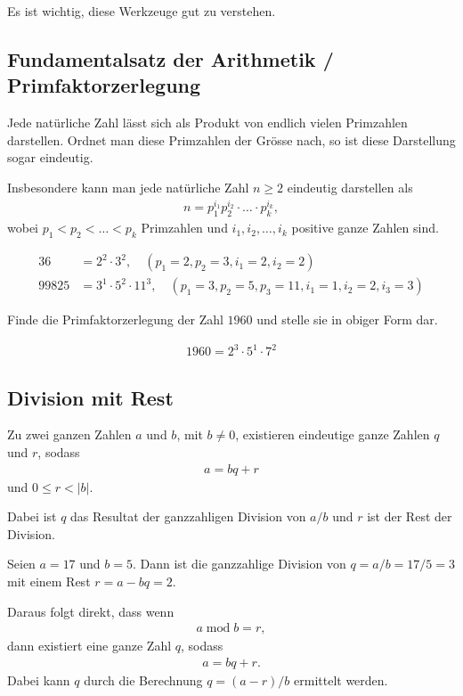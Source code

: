 Es ist wichtig, diese Werkzeuge gut zu verstehen.

\subsection{Fundamentalsatz der Arithmetik / Primfaktorzerlegung}
Jede natürliche Zahl lässt sich als Produkt von endlich vielen Primzahlen darstellen. Ordnet man diese Primzahlen der Grösse nach, so ist diese Darstellung sogar eindeutig.

Insbesondere kann man jede natürliche Zahl $n\geq 2$ eindeutig darstellen als
\begin{align}
	n = p_{1}^{i_1}p_{2}^{i_2}\cdot \ldots \cdot p_{k}^{i_k},
\end{align}
wobei $p_1<p_2<\ldots <p_k$ Primzahlen und $i_1, i_2, \ldots , i_k$ positive ganze Zahlen sind.

\begin{myexample}
\begin{align*}
	36    & = 2^2\cdot 3^2, \quad (p_1 = 2, p_2 = 3, i_1 = 2, i_2 = 2)                               \\
	99825 & = 3^1\cdot 5^2 \cdot 11^3, \quad (p_1 = 3, p_2 = 5, p_3 = 11, i_1 = 1, i_2 = 2, i_3 = 3)
\end{align*}
\end{myexample}

\begin{myexercise}
	Finde die Primfaktorzerlegung der Zahl $1960$ und stelle sie in obiger Form dar.
	\begin{myanswer}
		\begin{align*}
			1960 = 2^3\cdot 5^1\cdot 7^2
		\end{align*}
	\end{myanswer}
\end{myexercise}

\subsection{Division mit Rest}
Zu zwei ganzen Zahlen $a$ und $b$, mit $b\neq 0$, existieren eindeutige ganze Zahlen $q$ und $r$, sodass
\begin{align}
	a = bq + r
\end{align}
und $0\leq r < |b|$.

Dabei ist $q$ das Resultat der ganzzahligen Division von $a/b$ und $r$ ist der Rest der Division.

\begin{myexample}
Seien $a = 17$ und $b=5$. Dann ist die ganzzahlige Division von $q=a/b=17/5=3$ mit einem Rest $r=a-bq=2$.
\end{myexample}
Daraus folgt direkt, dass wenn
\begin{align}
	a\; \text{mod}\; b = r,
\end{align}
dann existiert eine ganze Zahl $q$, sodass
\begin{align}
	a = bq + r.
\end{align}
Dabei kann $q$ durch die Berechnung $q = (a-r)/b$ ermittelt werden.

